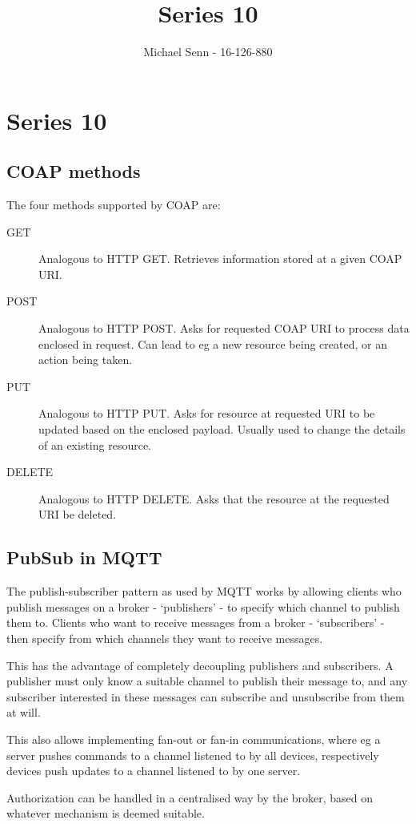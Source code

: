 \documentclass[a4paper]{scrreprt}
\title{Series 10}
\author{Michael Senn \maillink{michael.senn@students.unibe.ch} - 16-126-880}
\date{\printdate}
\begin{document}
\maketitle


\setcounter{chapter}{9}

\chapter{Series 10}

\section{COAP methods}

The four methods supported by COAP are:
\begin{description}
		\item[GET] Analogous to HTTP GET. Retrieves information stored at a
				given COAP URI.
		\item[POST] Analogous to HTTP POST. Asks for requested COAP URI to
				process data enclosed in request. Can lead to eg a new resource
				being created, or an action being taken.
		\item[PUT] Analogous to HTTP PUT. Asks for resource at requested URI
				to be updated based on the enclosed payload. Usually used to
				change the details of an existing resource.
		\item[DELETE] Analogous to HTTP DELETE. Asks that the resource at the
				requested URI be deleted.
\end{description}

\section{PubSub in MQTT}

The publish-subscriber pattern as used by MQTT works by allowing clients who
publish messages on a broker - `publishers' - to specify which channel to
publish them to.  Clients who want to receive messages from a broker -
`subscribers' - then specify from which channels they want to receive messages.

This has the advantage of completely decoupling publishers and subscribers. A
publisher must only know a suitable channel to publish their message to, and
any subscriber interested in these messages can subscribe and unsubscribe from
them at will.

This also allows implementing fan-out or fan-in communications, where eg a
server pushes commands to a channel listened to by all devices, respectively
devices push updates to a channel listened to by one server.

Authorization can be handled in a centralised way by the broker, based on
whatever mechanism is deemed suitable.
\end{document}
